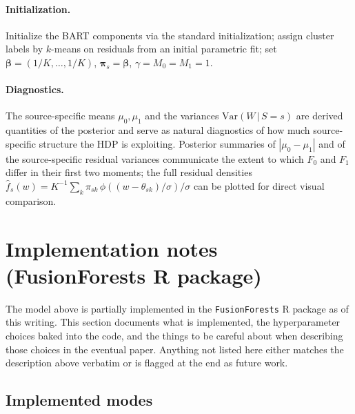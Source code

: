 \documentclass[11pt]{article}
\theoremstyle{plain}
\theoremstyle{definition}
\theoremstyle{remark}
\newcommand{\1}{\mathds{1}}
\newcommand{\given}{\,|\,}
\newcommand{\Var}{\mathrm{Var}}
\begin{document}
\paragraph{Initialization.} Initialize the BART components via the standard \citet{chipman2010bart} initialization; assign cluster labels by $k$-means on residuals from an initial parametric fit; set $\bm{\beta} = (1/K, \ldots, 1/K)$, $\bm{\pi}_s = \bm{\beta}$, $\gamma = M_0 = M_1 = 1$.

\paragraph{Diagnostics.} The source-specific means $\mu_0, \mu_1$ and the variances $\Var(W \given S = s)$ are derived quantities of the posterior and serve as natural diagnostics of how much source-specific structure the HDP is exploiting. Posterior summaries of $|\mu_0 - \mu_1|$ and of the source-specific residual variances communicate the extent to which $F_0$ and $F_1$ differ in their first two moments; the full residual densities $\hat f_s(w) = K^{-1} \sum_k \pi_{sk}\, \phi((w - \theta_{sk})/\sigma)/\sigma$ can be plotted for direct visual comparison.

\section{Implementation notes (FusionForests R package)}\label{sec:implementation}

The model above is partially implemented in the \texttt{FusionForests} R package as of this writing. This section documents what is implemented, the hyperparameter choices baked into the code, and the things to be careful about when describing those choices in the eventual paper. Anything not listed here either matches the description above verbatim or is flagged at the end as future work.

\subsection{Implemented modes}
\end{document}

